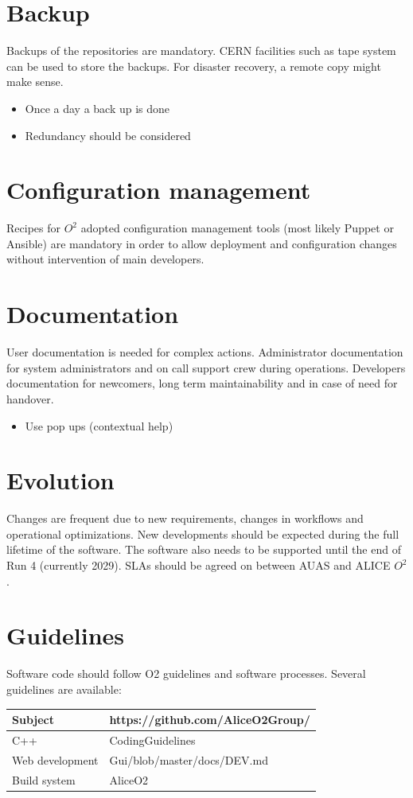\documentclass[a4paper,11pt]{book}
\begin{document}
\section{Backup}
Backups of the repositories are mandatory. CERN facilities such as tape system can be used to store the backups. For disaster recovery, a remote copy might make sense. 
\begin{itemize}
  \item Once a day a back up is done
  \item Redundancy should be considered
\end{itemize}

\section{Configuration management}
Recipes for $O^2$ adopted configuration management tools (most likely Puppet or Ansible) are mandatory in order to allow deployment and configuration changes without intervention of main developers. 

\section{Documentation}
User documentation is needed for complex actions. Administrator documentation for system administrators and on call support crew during operations. Developers documentation for newcomers, long term maintainability and in case of need for handover. 
\begin{itemize}
  \item Use pop ups (contextual help)
\end{itemize}

\section{Evolution}
Changes are frequent due to new requirements, changes in workflows and operational optimizations. New developments should be expected during the full lifetime of the software. The software also needs to be supported until the end of Run 4 (currently 2029). SLAs should be agreed on between AUAS and ALICE $O^2$.

\section{Guidelines}
Software code should follow O2 guidelines and software processes. Several guidelines are available:
\begin{table}
\begin{tabular}{lp{7cm}}
  \hline
  Subject & https://github.com/AliceO2Group/\\
  \hline
  \hline
   C++ & CodingGuidelines\\
   \hline
   Web development & Gui/blob/master/docs/DEV.md\\
   \hline
   Build system & AliceO2\\
   \hline
\end{tabular}
\end{table}
\end{document}
